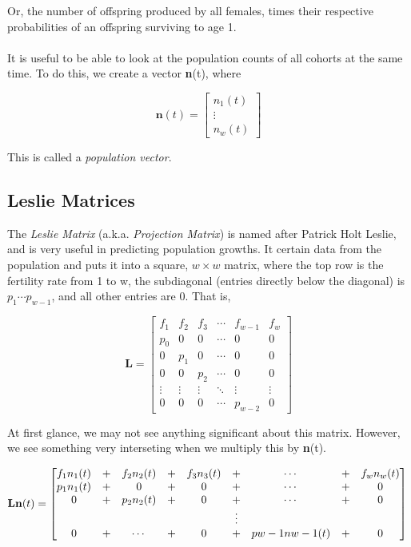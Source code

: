 \documentclass{article}
\begin{document}
Or, the number of offspring produced by all females, times their respective probabilities of an offspring surviving to age 1.

\paragraph{}
It is useful to be able to look at the population counts of all cohorts at the same time. To do this, we create a vector \textbf{n}(t), where

\begin{equation*}
\mathbf{n}(t)= \begin{bmatrix}
n_1(t)\\\vdots\\n_w(t)
\end{bmatrix}
\end{equation*}

This is called a \textit{population vector}.

\subsection{Leslie Matrices}
The \textit{Leslie Matrix} (a.k.a. \textit{Projection Matrix}) is named after Patrick Holt Leslie, and is very useful in predicting population growths. It certain data from the population and puts it into a square, $ w\times w $ matrix, where the top row is the fertility rate from 1 to w, the subdiagonal (entries directly below the diagonal) is $ p_1\cdots p_{w-1}$, and all other entries are 0. That is,

\begin{equation*}
\mathbf{L}= \begin{bmatrix}
f_1 & f_2 & f_3 & \cdots & f_{w-1} & f_w \\
p_0 & 0 & 0 & \cdots & 0 & 0 \\
0 & p_1 & 0 & \cdots & 0 & 0 \\
0 & 0 & p_2 & \cdots & 0 & 0 \\
\vdots & \vdots & \vdots & \ddots & \vdots & \vdots \\
0 & 0 & 0 & \cdots & p_{w-2} & 0
\end{bmatrix}
\end{equation*}

At first glance, we may not see anything significant about this matrix. However, we see something very interseting when we multiply this by \textbf{n}(t).

\begin{equation*}
\mathbf{Ln}(t)= \begin{bmatrix}

f_1n_1(t) & + & f_2n_2(t) & + & f_3n_3(t) & + & \cdots & + & f_wn_w(t) \\
p_1n_1(t) & + & 0 & + & 0 & + & \cdots & + & 0 \\
0 & + & p_2n_2(t) & + & 0 & + & \cdots & + & 0 \\
&&&&& \vdots \\
0 & + & \cdots & + & 0 & + & p{w-1}n{w-1}(t) & + & 0
\end{bmatrix}
\\
\end{equation*}
\end{document}
